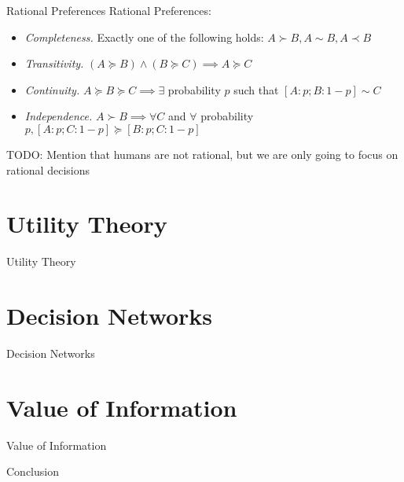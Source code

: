 \documentclass{beamer}
\begin{document}
\begin{frame}{Rational Preferences}
Rational Preferences:
\begin{itemize}
    \item \textit{Completeness.} Exactly one of the following holds: $A \succ B, A \sim B, A \prec B$
    \item \textit{Transitivity.} $(A \succeq B) \land (B \succeq C) \implies A \succeq C$
    \item \textit{Continuity.} $A \succeq B \succeq C \implies \exists$ probability $p$ such that $[A: p; B: 1-p] \sim C$
    \item \textit{Independence.} $A \succ B \implies \forall C$ and $\forall$ probability $p, [A:p;C:1-p] \succeq [B:p;C:1-p]$
\end{itemize}
TODO: Mention that humans are not rational, but we are only going to focus on rational decisions
\end{frame}


\section{Utility Theory}
\begin{frame}{Utility Theory}
\end{frame}

\section{Decision Networks}
\begin{frame}{Decision Networks}
\end{frame}

\section{Value of Information}
\begin{frame}{Value of Information}
\end{frame}

\begin{frame}{Conclusion}
\end{frame}
\end{document}
